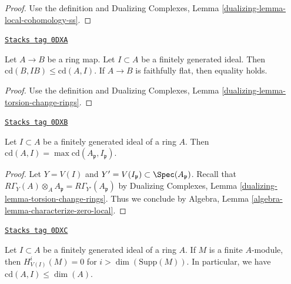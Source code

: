 \begin{proof}
Use the definition and Dualizing Complexes, Lemma
\ref{dualizing-lemma-local-cohomology-ss}.
\end{proof}

\begin{lemma}
\label{local-cohomology-lemma-cd-change-rings}
\href{https://stacks.math.columbia.edu/tag/0DXA}{\texttt{Stacks tag 0DXA}}

Let $A \to B$ be a ring map. Let $I \subset A$ be a finitely generated ideal.
Then $\text{cd}(B, IB) \leq \text{cd}(A, I)$. If $A \to B$ is faithfully
flat, then equality holds.
\end{lemma}

\begin{proof}
Use the definition and
Dualizing Complexes, Lemma \ref{dualizing-lemma-torsion-change-rings}.
\end{proof}

\begin{lemma}[Cd local]
\label{local-cohomology-lemma-cd-local}
\href{https://stacks.math.columbia.edu/tag/0DXB}{\texttt{Stacks tag 0DXB}}

Let $I \subset A$ be a finitely generated ideal of a ring $A$.
Then $\text{cd}(A, I) = \max \text{cd}(A_\mathfrak p, I_\mathfrak p)$.
\end{lemma}

\begin{proof}
Let $Y = V(I)$ and $Y' = V(I_\mathfrak p) \subset \Spec(A_\mathfrak p)$.
Recall that
$R\Gamma_Y(A) \otimes_A A_\mathfrak p = R\Gamma_{Y'}(A_\mathfrak p)$
by Dualizing Complexes, Lemma \ref{dualizing-lemma-torsion-change-rings}.
Thus we conclude by Algebra, Lemma \ref{algebra-lemma-characterize-zero-local}.
\end{proof}

\begin{lemma}[Cd dimension]
\label{local-cohomology-lemma-cd-dimension}
\href{https://stacks.math.columbia.edu/tag/0DXC}{\texttt{Stacks tag 0DXC}}

Let $I \subset A$ be a finitely generated ideal of a ring $A$.
If $M$ is a finite $A$-module, then
$H^i_{V(I)}(M) = 0$ for $i > \dim(\text{Supp}(M))$.
In particular, we have $\text{cd}(A, I) \leq \dim(A)$.
\end{lemma}

